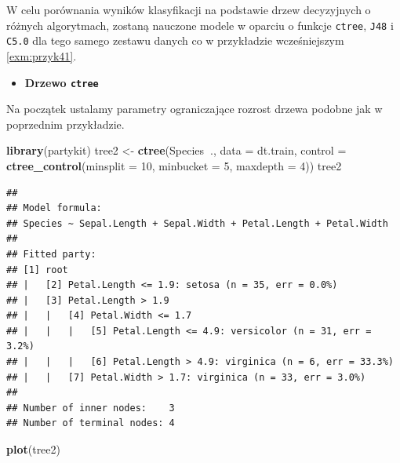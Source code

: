 \documentclass[
]{book}
\newenvironment{Shaded}{\begin{snugshade}}{\end{snugshade}}
\newcommand{\DataTypeTok}[1]{\textcolor[rgb]{0.13,0.29,0.53}{#1}}
\newcommand{\DecValTok}[1]{\textcolor[rgb]{0.00,0.00,0.81}{#1}}
\newcommand{\KeywordTok}[1]{\textcolor[rgb]{0.13,0.29,0.53}{\textbf{#1}}}
\newcommand{\NormalTok}[1]{#1}
\newcommand{\OperatorTok}[1]{\textcolor[rgb]{0.81,0.36,0.00}{\textbf{#1}}}
\newcommand{\StringTok}[1]{\textcolor[rgb]{0.31,0.60,0.02}{#1}}
\providecommand{\tightlist}{%
  \setlength{\itemsep}{0pt}\setlength{\parskip}{0pt}}
\theoremstyle{plain}
\theoremstyle{definition}
\theoremstyle{definition}
\theoremstyle{definition}
\theoremstyle{definition}
\theoremstyle{remark}
\let\BeginKnitrBlock\begin \let\EndKnitrBlock\end
\begin{document}
\BeginKnitrBlock{example}
\protect\hypertarget{exm:przyk42}{}{\label{exm:przyk42} }W celu porównania wyników klasyfikacji na podstawie drzew decyzyjnych o różnych algorytmach, zostaną nauczone modele w oparciu o funkcje \texttt{ctree}, \texttt{J48} i \texttt{C5.0} dla tego samego zestawu danych co w przykładzie wcześniejszym \ref{exm:przyk41}.
\EndKnitrBlock{example}

\begin{itemize}
\tightlist
\item
  \textbf{Drzewo \texttt{ctree}}
\end{itemize}

Na początek ustalamy parametry ograniczające rozrost drzewa podobne jak w poprzednim przykładzie.

\begin{Shaded}
\begin{Highlighting}[]
\KeywordTok{library}\NormalTok{(partykit)}
\NormalTok{tree2 <-}\StringTok{ }\KeywordTok{ctree}\NormalTok{(Species}\OperatorTok{~}\NormalTok{., }\DataTypeTok{data =}\NormalTok{ dt.train,}
               \DataTypeTok{control =} \KeywordTok{ctree_control}\NormalTok{(}\DataTypeTok{minsplit =} \DecValTok{10}\NormalTok{,}
                                       \DataTypeTok{minbucket =} \DecValTok{5}\NormalTok{,}
                                       \DataTypeTok{maxdepth =} \DecValTok{4}\NormalTok{))}
\NormalTok{tree2}
\end{Highlighting}
\end{Shaded}

\begin{verbatim}
## 
## Model formula:
## Species ~ Sepal.Length + Sepal.Width + Petal.Length + Petal.Width
## 
## Fitted party:
## [1] root
## |   [2] Petal.Length <= 1.9: setosa (n = 35, err = 0.0%)
## |   [3] Petal.Length > 1.9
## |   |   [4] Petal.Width <= 1.7
## |   |   |   [5] Petal.Length <= 4.9: versicolor (n = 31, err = 3.2%)
## |   |   |   [6] Petal.Length > 4.9: virginica (n = 6, err = 33.3%)
## |   |   [7] Petal.Width > 1.7: virginica (n = 33, err = 3.0%)
## 
## Number of inner nodes:    3
## Number of terminal nodes: 4
\end{verbatim}

\begin{Shaded}
\begin{Highlighting}[]
\KeywordTok{plot}\NormalTok{(tree2)}
\end{Highlighting}
\end{Shaded}
\end{document}
